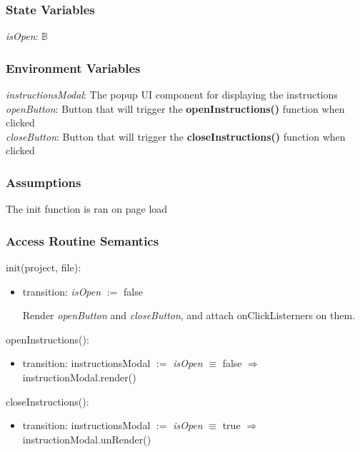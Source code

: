 \documentclass[12pt, titlepage]{article}
\begin{document}
	\subsubsection{State Variables}
	
	\textit{isOpen}: $\mathbb{B}$
	
	\subsubsection{Environment Variables}
	
	\textit{instructionsModal}: The popup UI component for displaying the instructions\\
	
	\noindent \textit{openButton}: Button that will trigger the \textbf{openInstructions()} function when clicked\\
	
	\noindent \textit{closeButton}: Button that will trigger the \textbf{closeInstructions()} function when clicked
	
	\subsubsection{Assumptions}
	
	The init function is ran on page load
	
	\subsubsection{Access Routine Semantics}
	
	\noindent init(project, file):
	\begin{itemize}
		\item transition: \textit{isOpen} $:=$ false
		
		\noindent Render \textit{openButton} and \textit{closeButton}, and attach onClickListerners on them. 
	\end{itemize}
	
	\noindent openInstructions():
	\begin{itemize}
		\item transition: instructionsModal $:=$ \textit{isOpen} $\equiv$ false $\Rightarrow$ instructionModal.render()
	\end{itemize}
	
	\noindent closeInstructions():
	\begin{itemize}
		\item transition: instructionsModal $:=$ \textit{isOpen} $\equiv$ true $\Rightarrow$ instructionModal.unRender()
	\end{itemize}
	
\end{document}
